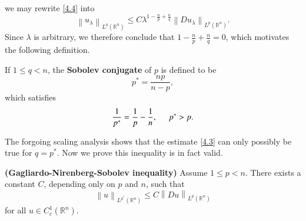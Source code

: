 we may rewrite \eqref{4.4} into 
$$
\left\| u_{\lambda} \right\| _{L^q\left( \mathbb{R} ^n \right)}\le C\lambda ^{1-\frac{n}{p}+\frac{n}{q}}\left\| Du_{\lambda} \right\| _{L^p\left( \mathbb{R} ^n \right)}.
$$
Since $\lambda$ is arbitrary, we therefore conclude that $1-\frac{n}{p}+\frac{n}{q}=0$, which motivates the following definition.
\begin{definition}
If $1\le q<n$, the \textbf{Sobolev conjugate} of $p$ is defined to be 
$$
p^*=\frac{np}{n-p},
$$
which satisfies 
$$
\frac{1}{p^*}=\frac{1}{p}-\frac{1}{n},\hspace{0.5cm}p^*>p.
$$
\end{definition}
The forgoing scaling analysis shows that the estimate \eqref{4.3} can only possibly be true for $q=p^*$. Now we prove this inequality is in fact valid.
\begin{theorem}{\textbf{(Gagliardo-Nirenberg-Sobolev inequality)}}\label{Thm4.6.2}
Assume $1\le p<n$. There exists a constant $C$, depending only on $p$ and $n$, such that 
$$
\left\| u \right\| _{L^{p^*}\left( \mathbb{R} ^n \right)}\le C\left\| Du \right\| _{L^p\left( \mathbb{R} ^n \right)}
$$
for all $u\in C_c^1(\mathbb{R}^n)$.
\end{theorem}
